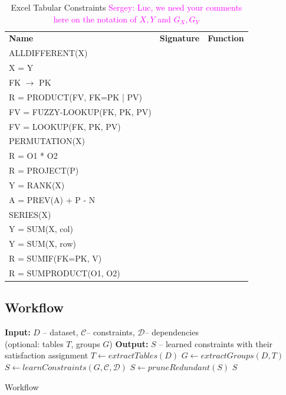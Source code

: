 \documentclass{ecai}
\newcommand{\sergey}[1]{\textcolor{magenta}{{\sc Sergey:} #1}\xspace}
\newcommand{\constraints}{\ensuremath{\mathcal{C}}\xspace}
\newcommand{\format}[1]{\textit{#1}\xspace}
\newcommand{\extractgroups}{\format{extractGroups}}
\newcommand{\extracttables}{\format{extractTables}}
\newcommand{\learnconstraints}{\format{learnConstraints}}
\newcommand{\postprocess}{\format{pruneRedundant}}
\newcommand{\CName}{Name\xspace}
\newcommand{\CSignature}{Signature\xspace}
\newcommand{\CFunction}{Function\xspace}
\newcommand{\dependencies}{\ensuremath{\mathcal{D}}\xspace}
\begin{document}
\begin{table}
  \centering
  \begin{tabular}{lcc}
    \textbf{\CName} & \textbf{\CSignature} & \textbf{\CFunction}\\
    ALLDIFFERENT(X) & & \\
    X = Y & & \\
    FK $\rightarrow$ PK & & \\
    R = PRODUCT(FV, FK=PK | PV) & & \\
    FV = FUZZY-LOOKUP(FK, PK, PV) & & \\
    FV = LOOKUP(FK, PK, PV) & & \\
    PERMUTATION(X) & & \\
    R = O1 * O2 & & \\
    R = PROJECT(P) & & \\
     Y = RANK(X)   & & \\
    A = PREV(A) + P - N & & \\
    SERIES(X) & & \\
    Y = SUM(X, col) & & \\
    Y = SUM(X, row) & & \\
    R = SUMIF(FK=PK, V) & & \\
    R = SUMPRODUCT(O1, O2) & & \\

  \end{tabular}
  \caption{Excel Tabular Constraints \sergey{Luc, we need your comments here on the notation of $X,Y$ and $G_X,G_Y$}}
  \label{table:constraints}
\end{table}

\subsection{Workflow}
\begin{algorithm}[thb]
  \begin{algorithmic}
    \footnotesize
    \State \textbf{Input:} $D$ -- dataset, \constraints -- constraints, \dependencies -- dependencies \\(optional: tables $T$, groups $G$)
    \State \textbf{Output:} $S$ -- learned constraints with their satisfaction assignment
      \State $T \gets \extracttables(D)$
    \EndIf
      \State $G \gets \extractgroups(D, T)$
    \EndIf
    \State $S \gets \learnconstraints(G,\constraints,\dependencies)$
    \State $S \gets \postprocess(S)$
    \State \Return $S$
\end{algorithmic}
\caption{Workflow}
\label{algo:workflow}
\end{algorithm}
\end{document}
